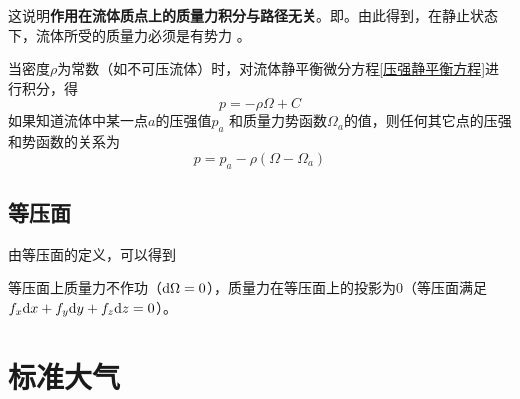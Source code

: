 这说明\textbf{作用在流体质点上的质量力积分与路径无关}。即\blue[质量力是有势力]。由此得到，在静止状态下，流体所受的质量力必须是有势力 。 

当密度$\rho$为常数（如不可压流体）时，对流体静平衡微分方程\eqref{压强静平衡方程}进行积分，得
\begin{equation}
	p = - \rho \Omega + C
\end{equation}
如果知道流体中某一点$a$的压强值$p_a$ 和质量力势函数$\Omega_a$的值，则任何其它点的压强和势函数的关系为
\begin{equation}
	p = p_a - \rho \left(\Omega - \Omega_a\right)
\end{equation}

\subsection{等压面}
\vspace*{-1em}

由等压面的定义，可以得到

\vspace*{-0.5em}

等压面上质量力不作功（${\rm{d}} \Omega = 0$），质量力在等压面上的投影为0（等压面满足$f_x  {\rm{d}} x + f_y {\rm{d}} y + f_z {\rm{d}} z = 0$）。
\section{标准大气}

